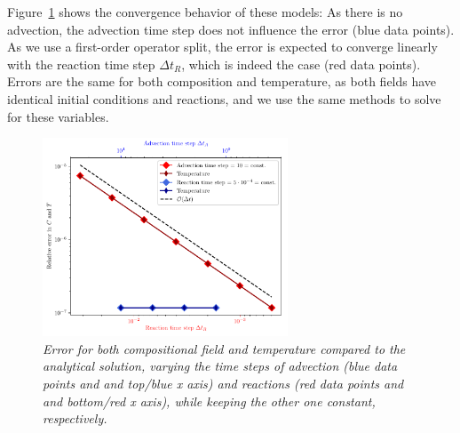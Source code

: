 \documentclass{article}
\begin{document}
Figure~\ref{fig:exponential-decay} shows the convergence behavior of these models: As there is no advection, the advection time step does not influence the error (blue data points). As we use a first-order operator split, the error is expected to converge linearly with the reaction time step $\Delta t_R$, which is indeed the case (red data points).
Errors are the same for both composition and temperature, as both fields have identical initial conditions and reactions, and we use the same methods to solve for these variables. 
\begin{figure}
  \begin{center}
    \includegraphics[width=0.65\textwidth]{cookbooks/benchmarks/operator_splitting/error_exponential_decay.pdf}
  \end{center}
  \caption{\it Error for both compositional field and temperature compared to the analytical solution, varying the time steps of advection (blue data points and and top/blue x axis) and reactions (red data points and and bottom/red x axis), while keeping the other one constant, respectively.}
  \label{fig:exponential-decay}
\end{figure}
\end{document}
